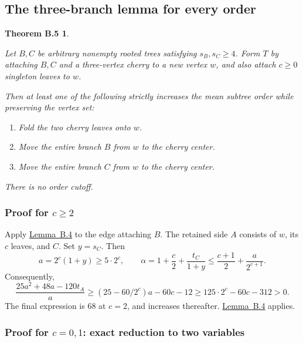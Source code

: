 \documentclass[11pt,letterpaper]{article}
\providecommand{\tightlist}{\setlength{\itemsep}{0.12em}\setlength{\parskip}{0pt}}
\theoremstyle{plain}
\newtheorem*{apptheoremfive}{Theorem B.5}
\begin{document}
\subsection{The three-branch lemma for every order}\label{b.4.-the-three-branch-lemma-for-every-order}

\begin{apptheoremfive}\label{thm:app-5}

Let \(B,C\) be arbitrary nonempty rooted trees satisfying \(s_B,s_C\ge4\). Form \(T\) by attaching \(B,C\) and a three-vertex cherry to a new vertex \(w\), and also attach \(c\ge0\) singleton leaves to \(w\).

Then at least one of the following strictly increases the mean subtree order while preserving the vertex set:

\begin{enumerate}
\def\labelenumi{\arabic{enumi}.}
\tightlist
\item
  Fold the two cherry leaves onto \(w\).
\item
  Move the entire branch \(B\) from \(w\) to the cherry center.
\item
  Move the entire branch \(C\) from \(w\) to the cherry center.
\end{enumerate}

There is no order cutoff.

\end{apptheoremfive}

\subsubsection*{\texorpdfstring{Proof for \(c\ge2\)}{Proof for c >= 2}}\label{proof-for-cge2}

Apply \hyperref[lem:app-4]{Lemma~B.4} to the edge attaching \(B\). The retained side \(A\) consists of \(w\), its \(c\) leaves, and \(C\). Set \(y=s_C\). Then \[
a=2^c(1+y)\ge5\cdot2^c,
\qquad
\alpha=1+\frac c2+\frac{t_C}{1+y}
\le\frac{c+1}{2}+\frac{a}{2^{c+1}}.
\] Consequently, \[
\frac{25a^2+48a-120t_A}{a}
\ge(25-60/2^c)a-60c-12
\ge125\cdot2^c-60c-312>0.
\] The final expression is 68 at \(c=2\), and increases thereafter. \hyperref[lem:app-4]{Lemma~B.4} applies.

\subsubsection*{\texorpdfstring{Proof for \(c=0,1\): exact reduction to two variables}{Proof for c=0,1: exact reduction to two variables}}\label{proof-for-c01-exact-reduction-to-two-variables}
\end{document}
